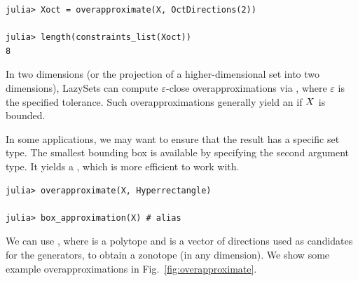 \begin{minipage}{\linewidth}
\vspace{-\abovedisplayskip}
\begin{lstlisting}
julia> Xoct = overapproximate(X, OctDirections(2))

julia> length(constraints_list(Xoct))
8
\end{lstlisting}
\end{minipage}

In two dimensions (or the projection of a higher-dimensional set into two dimensions), LazySets can compute $\varepsilon$-close overapproximations via , where $\varepsilon$ is the specified tolerance.
%
Such overapproximations generally yield an  if $X$ is bounded.

\smallskip

In some applications, we may want to ensure that the result has a specific set type.
The smallest bounding box is available by specifying the second argument type. It yields a , which is more efficient to work with.

\begin{minipage}{\linewidth}
	\vspace{-\abovedisplayskip}
	\begin{lstlisting}
julia> overapproximate(X, Hyperrectangle)

julia> box_approximation(X) # alias
\end{lstlisting}
\end{minipage}

We can use , where  is a polytope and  is a vector of directions used as candidates for the generators, to obtain a zonotope (in any dimension). We show some example overapproximations in Fig.~\ref{fig:overapproximate}.
